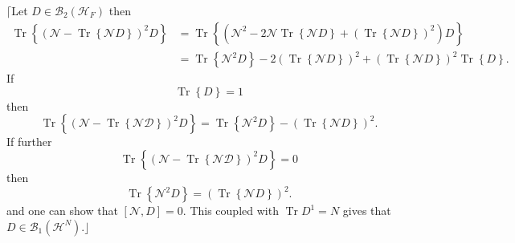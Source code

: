 \documentclass[aps,preprint]{revtex4}%
\begin{document}
$\lceil$Let $D\in\mathcal{B}_{2}\left(  \mathcal{H}_{F}\right)  $ then
\begin{align}
\operatorname{Tr}\left\{  \left(  \mathcal{N}-\operatorname{Tr}\left\{
\mathcal{N}D\right\}  \right)  ^{2}D\right\}   &  =\operatorname{Tr}\left\{
\left(  \mathcal{N}^{2}-2\mathcal{N}\operatorname{Tr}\left\{  \mathcal{N}%
D\right\}  +\left(  \operatorname{Tr}\left\{  \mathcal{N}D\right\}  \right)
^{2}\right)  D\right\}  \nonumber\\
&  =\operatorname{Tr}\left\{  \mathcal{N}^{2}D\right\}  -2\left(
\operatorname{Tr}\left\{  \mathcal{N}D\right\}  \right)  ^{2}+\left(
\operatorname{Tr}\left\{  \mathcal{N}D\right\}  \right)  ^{2}\operatorname{Tr}%
\left\{  D\right\}  .
\end{align}
If
\begin{equation}
\operatorname{Tr}\left\{  D\right\}  =1
\end{equation}
then
\begin{equation}
\operatorname{Tr}\left\{  \left(  \mathcal{N}-\operatorname{Tr}\left\{
\mathcal{ND}\right\}  \right)  ^{2}D\right\}  =\operatorname{Tr}\left\{
\mathcal{N}^{2}D\right\}  -\left(  \operatorname{Tr}\left\{  \mathcal{N}%
D\right\}  \right)  ^{2}.
\end{equation}
If further
\begin{equation}
\operatorname{Tr}\left\{  \left(  \mathcal{N}-\operatorname{Tr}\left\{
\mathcal{ND}\right\}  \right)  ^{2}D\right\}  =0
\end{equation}
then
\begin{equation}
\operatorname{Tr}\left\{  \mathcal{N}^{2}D\right\}  =\left(  \operatorname{Tr}%
\left\{  \mathcal{N}D\right\}  \right)  ^{2}.
\end{equation}
and one can show that $\left[  \mathcal{N},D\right]  =0.$ This coupled with
$\operatorname{Tr}D^{1}=N$ gives that $D\in\mathcal{B}_{1}\left(
\mathcal{H}^{N}\right)  .\rfloor$
\end{document}
